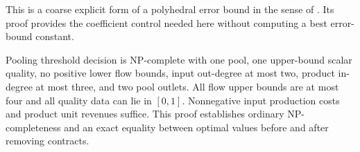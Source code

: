 This is a coarse explicit form of a polyhedral error bound in the sense
of \citet[Section~2]{s3:hoffman1952}. Its proof provides the coefficient
control needed here without computing a best error-bound constant.

\begin{theorem}\label{s3:upper-only}
Pooling threshold decision is NP-complete with one pool, one upper-bound
scalar quality, no positive lower flow bounds, input out-degree at most
two, product in-degree at most three, and two pool outlets. All flow
upper bounds are at most four and all quality data can lie in $[0,1]$.
Nonnegative input production costs and product unit revenues suffice.
This proof establishes ordinary NP-completeness and an exact equality
between optimal values before and after removing contracts.
\end{theorem}
